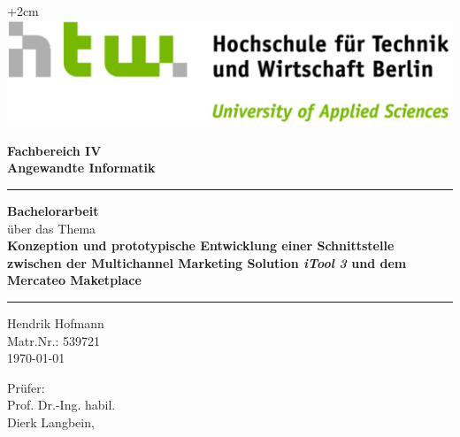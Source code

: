 \documentclass[10pt,a4paper,bibliography=totocnumbered,listof=totocnumbered]{scrartcl}
\begin{document}
\begin{center}
		\vspace*{.2cm}
		\begin{flushright}
			\advance\rightskip+2cm
			\includegraphics[width=.4\textwidth]{img/HTW-quer-rgb.pdf} %
		\end{flushright}
	\vspace*{3cm}
	\Large
	\textbf{Fachbereich IV}\\
	\textbf{Angewandte Informatik}\\
	\vspace*{2cm}
	{\rule{\linewidth}{0.5mm}}
	\Huge
	\textbf{Bachelorarbeit}\\
	\vspace*{0.5cm}
	\large
	über das Thema\\
	\vspace*{1cm}
	\textbf{Konzeption und prototypische Entwicklung einer Schnittstelle zwischen der Multichannel Marketing Solution \textit{iTool 3} und dem Mercateo Maketplace}\\
	{\rule{\linewidth}{0.5mm}}
	\vspace*{2cm}
	
	\vfill
	\normalsize
		\begin{minipage}[t]{0.4\textwidth}
			\begin{flushleft} %
				
				Hendrik Hofmann\\ Matr.Nr.: 539721 \\{\today}
				
			\end{flushleft}
		\end{minipage}
		\begin{minipage}[t]{0.3\textwidth}
			\begin{flushright} %
				  Prüfer: \\Prof. Dr.-Ing. habil. \\Dierk Langbein, \\ 
			\end{flushright}
		\end{minipage}
\end{center}
\pagebreak



\renewcommand{\cfttabpresnum}{Tab. }
\renewcommand{\cftfigpresnum}{Abb. }
\settowidth{\cfttabnumwidth}{Abb. 10\quad}
\settowidth{\cftfignumwidth}{Abb. 10\quad}
\end{document}
